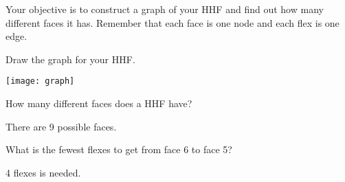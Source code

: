 \documentclass[a4paper,12pt]{article}
\begin{document}
Your objective is to construct a graph of your HHF and find out how many
different faces it has. Remember that each face is one node and each flex is one
edge.

\begin{question}[skip-below=20\baselineskip]
Draw the graph for your HHF.
\end{question}
\begin{solution}
\texttt{[image: graph]}
\end{solution}

\begin{question}[skip-below=3\baselineskip]
How many different faces does a HHF have?
\end{question}
\begin{solution}
There are 9 possible faces.  
\end{solution}

\begin{question}[skip-below=3\baselineskip]
What is the fewest flexes to get from face 6 to face 5?
\end{question}
\begin{solution}
4 flexes is needed.
\end{solution}
\end{document}
